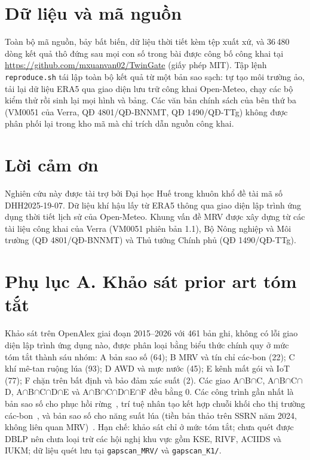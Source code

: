 \documentclass[10pt]{article}
\begin{document}
\section*{Dữ liệu và mã nguồn}
Toàn bộ mã nguồn, bảy bất biến, dữ liệu thời tiết kèm tệp xuất xứ, và 36\,480 dòng kết quả thô đứng sau mọi con số trong bài được công bố công khai tại \url{https://github.com/mxuanvan02/TwinGate} (giấy phép MIT). Tập lệnh \texttt{reproduce.sh} tái lập toàn bộ kết quả từ một bản sao sạch: tự tạo môi trường ảo, tải lại dữ liệu ERA5 qua giao diện lưu trữ công khai Open-Meteo, chạy các bộ kiểm thử rồi sinh lại mọi hình và bảng. Các văn bản chính sách của bên thứ ba (VM0051 của Verra, QĐ 4801/QĐ-BNNMT, QĐ 1490/QĐ-TTg) không được phân phối lại trong kho mã mà chỉ trích dẫn nguồn công khai.

\section*{Lời cảm ơn}
Nghiên cứu này được tài trợ bởi Đại học Huế trong khuôn khổ đề tài mã số DHH2025-19-07. Dữ liệu khí hậu lấy từ ERA5 thông qua giao diện lập trình ứng dụng thời tiết lịch sử của Open-Meteo. Khung vấn đề MRV được xây dựng từ các tài liệu công khai của Verra (VM0051 phiên bản 1.1), Bộ Nông nghiệp và Môi trường (QĐ 4801/QĐ-BNNMT) và Thủ tướng Chính phủ (QĐ 1490/QĐ-TTg).



\appendix
\section*{Phụ lục A. Khảo sát prior art tóm tắt}
Khảo sát trên OpenAlex giai đoạn 2015--2026 với 461 bản ghi, không có lỗi giao diện lập trình ứng dụng nào, được phân loại bằng biểu thức chính quy ở mức tóm tắt thành sáu nhóm: A bản sao số (64); B MRV và tín chỉ các-bon (22); C khí mê-tan ruộng lúa (93); D AWD và mực nước (45); E kênh mất gói và IoT (77); F chặn trên bất định và bảo đảm xác suất (2). Các giao A$\cap$B$\cap$C, A$\cap$B$\cap$C$\cap$D, A$\cap$B$\cap$C$\cap$D$\cap$E và A$\cap$B$\cap$C$\cap$D$\cap$E$\cap$F đều bằng 0. Các công trình gần nhất là bản sao số cho phục hồi rừng~\cite{sasaki2025}, trí tuệ nhân tạo kết hợp chuỗi khối cho thị trường các-bon~\cite{islam2025}, và bản sao số cho năng suất lúa (tiền bản thảo trên SSRN năm 2024, không liên quan MRV)~\cite{narayanan2024}. Hạn chế: khảo sát chỉ ở mức tóm tắt; chưa quét được DBLP nên chưa loại trừ các hội nghị khu vực gồm KSE, RIVF, ACIIDS và IUKM; dữ liệu quét lưu tại \texttt{gapscan\_MRV/} và \texttt{gapscan\_K1/}.
\end{document}
